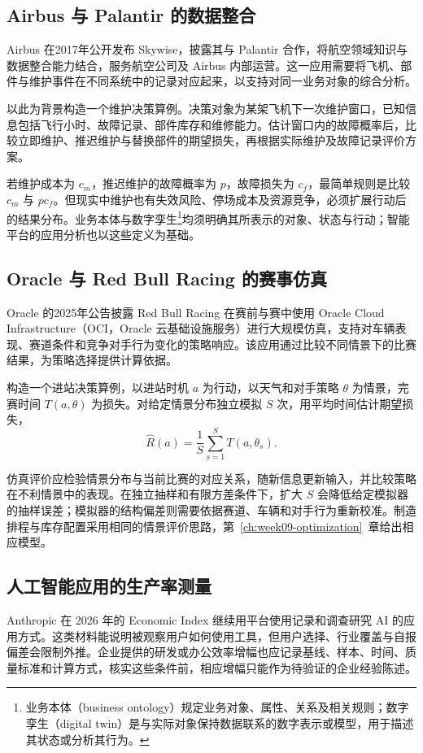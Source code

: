 \subsection{Airbus 与 Palantir 的数据整合}
Airbus 在2017年公开发布 Skywise，披露其与 Palantir 合作，将航空领域知识与数据整合能力结合，服务航空公司及 Airbus 内部运营\cite{airbus01}。这一应用需要将飞机、部件与维护事件在不同系统中的记录对应起来，以支持对同一业务对象的综合分析。

以此为背景构造一个维护决策算例。决策对象为某架飞机下一次维护窗口，已知信息包括飞行小时、故障记录、部件库存和维修能力。估计窗口内的故障概率后，比较立即维护、推迟维护与替换部件的期望损失，再根据实际维护及故障记录评价方案。

若维护成本为 \(c_m\)，推迟维护的故障概率为 \(p\)，故障损失为 \(c_f\)，最简单规则是比较 \(c_m\) 与 \(pc_f\)。但现实中维护也有失效风险、停场成本及资源竞争，必须扩展行动后的结果分布。业务本体与数字孪生\footnote{业务本体（business ontology）规定业务对象、属性、关系及相关规则；数字孪生（digital twin）是与实际对象保持数据联系的数字表示或模型，用于描述其状态或分析其行为。}均须明确其所表示的对象、状态与行动；智能平台的应用分析也以这些定义为基础。

\subsection{Oracle 与 Red Bull Racing 的赛事仿真}
Oracle 的2025年公告披露 Red Bull Racing 在赛前与赛中使用 Oracle Cloud Infrastructure（OCI，Oracle 云基础设施服务）进行大规模仿真，支持对车辆表现、赛道条件和竞争对手行为变化的策略响应\cite{oracle01}。该应用通过比较不同情景下的比赛结果，为策略选择提供计算依据。

构造一个进站决策算例，以进站时机 \(a\) 为行动，以天气和对手策略 \(\theta\) 为情景，完赛时间 \(T(a,\theta)\) 为损失。对给定情景分布独立模拟 \(S\) 次，用平均时间估计期望损失，
\[
\widehat R(a)=\frac1S\sum_{s=1}^S T(a,\theta_s).
\]

仿真评价应检验情景分布与当前比赛的对应关系，随新信息更新输入，并比较策略在不利情景中的表现。在独立抽样和有限方差条件下，扩大 \(S\) 会降低给定模拟器的抽样误差；模拟器的结构偏差则需要依据赛道、车辆和对手行为重新校准。制造排程与库存配置采用相同的情景评价思路，第~\ref{ch:week09-optimization}~章给出相应模型。

\subsection{人工智能应用的生产率测量}
Anthropic 在 2026 年的 Economic Index 继续用平台使用记录和调查研究 AI 的应用方式\cite{aiindex08}。这类材料能说明被观察用户如何使用工具，但用户选择、行业覆盖与自报偏差会限制外推。企业提供的研发或办公效率增幅也应记录基线、样本、时间、质量标准和计算方式，核实这些条件前，相应增幅只能作为待验证的企业经验陈述。


